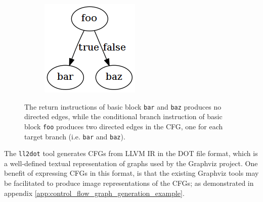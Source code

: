 \begin{figure}[htbp]
	\centering
	\begin{subfigure}[ht]{0.54\textwidth}
		
	\end{subfigure}
	\enskip
	\begin{subfigure}[ht]{0.22\textwidth}
		\includegraphics[width=\textwidth]{inc/8_ver/directed_edges.png}
	\end{subfigure}
	\caption{The return instructions of basic block \texttt{bar} and \texttt{baz} produces no directed edges, while the conditional branch instruction of basic block \texttt{foo} produces two directed edges in the CFG, one for each target branch (i.e. \texttt{bar} and \texttt{baz}).}
	\label{fig:directed_edges}
\end{figure}

The \texttt{ll2dot} tool generates CFGs from LLVM IR in the DOT file format, which is a well-defined textual representation of graphs used by the Graphviz project. One benefit of expressing CFGs in this format, is that the existing Graphviz tools may be facilitated to produce image representations of the CFGs; as demonstrated in appendix \ref{app:control_flow_graph_generation_example}.
